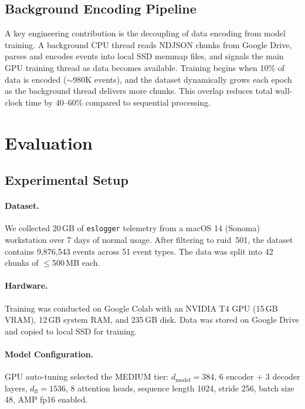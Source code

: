 \documentclass[letterpaper,twocolumn,10pt]{article}
\begin{document}
\subsection{Background Encoding Pipeline}

A key engineering contribution is the decoupling of data encoding
from model training. A background CPU thread reads NDJSON chunks
from Google Drive, parses and encodes events into local SSD memmap
files, and signals the main GPU training thread as data becomes
available. Training begins when 10\% of data is encoded
($\sim$980K events), and the dataset dynamically grows each epoch
as the background thread delivers more chunks. This overlap reduces
total wall-clock time by 40--60\% compared to sequential
processing.


\section{Evaluation}

\subsection{Experimental Setup}

\paragraph{Dataset.} We collected 20\,GB of \texttt{eslogger}
telemetry from a macOS 14 (Sonoma) workstation over 7 days of
normal usage. After filtering to ruid~501, the dataset contains
9,876,543 events across 51 event types. The data was split into
42 chunks of $\leq$500\,MB each.

\paragraph{Hardware.} Training was conducted on Google Colab with
an NVIDIA T4 GPU (15\,GB VRAM), 12\,GB system RAM, and 235\,GB
disk. Data was stored on Google Drive and copied to local SSD for
training.

\paragraph{Model Configuration.} GPU auto-tuning selected the
MEDIUM tier: $d_{\text{model}}=384$, 6 encoder + 3 decoder layers,
$d_{\text{ff}}=1536$, 8 attention heads, sequence length 1024,
stride 256, batch size 48, AMP fp16 enabled.
\end{document}
